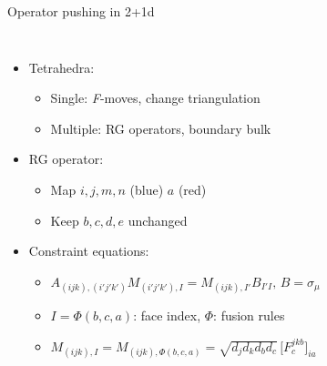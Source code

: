 \documentclass{fdubeamer}
\newcommand{\tikzinput}[1]{}
\newcommand{\1}{\mathbb{1}}
\begin{document}
\begin{frame}{Operator pushing in 2+1d}

\begin{columns}[c]


    \begin{itemize}
      \item Tetrahedra:

        \begin{itemize}
          \item Single: \textit{F}-moves, change triangulation
          \item Multiple: RG operators, boundary \textrightarrow{} bulk
        \end{itemize}

      \item RG operator:

        \begin{itemize}
          \item Map $i,j,m,n$ (blue) \textrightarrow{} $a$ (red)
          \item Keep $b,c,d,e$ unchanged
        \end{itemize}

      \item Constraint equations:

        \begin{itemize}
          \item $A_{(ijk), (i'j'k')} M_{(i'j'k'), I} = M_{(ijk), I'} B_{I'I}, \, B=\sigma_\mu$ \\[0.5ex]
          \item $I=\Phi(b,c,a)$: face index, $\Phi$: fusion rules
          \item $M_{(ijk), I} = M_{(ijk), \Phi(b,c,a)} = \sqrt{d_j d_k d_b d_c} \, \bigl[ F^{jkb}_c \bigr]_{ia}$
        \end{itemize}
    \end{itemize}


    \begin{center}
      \scriptsize
      \tikzset{x=1em, y=1em, node font=\tiny}
      \tikzinput{operator-pushing/rg-2+1d-f-move-alt} \\[1ex]
      \tikzinput{operator-pushing/rg-2+1d-rg} \\[1ex]
      \tikzinput{operator-pushing/tetrahedra-double-1} \quad
      \tikzinput{operator-pushing/tetrahedra-single}
    \end{center}

\end{columns}


\end{frame}
\end{document}
